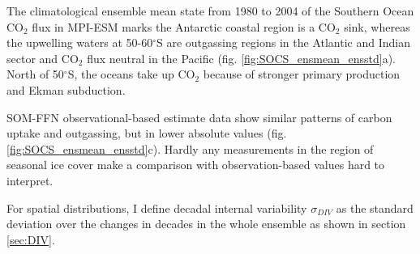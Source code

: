 The climatological ensemble mean state from 1980 to 2004 of the Southern Ocean CO$_2$ flux in \acs{MPI-ESM} marks the Antarctic coastal region is a CO$_2$ sink, whereas the upwelling waters at 50-60$^\circ$S are outgassing regions in the Atlantic and Indian sector and CO$_2$ flux neutral in the Pacific (fig. \ref{fig:SOCS_ensmean_ensstd}a). North of 50$^\circ$S, the oceans take up CO$_2$ because of stronger primary production and Ekman subduction.\newline

 
\acs{SOM-FFN} observational-based estimate data show similar patterns of carbon uptake and outgassing, but in lower absolute values (fig. \ref{fig:SOCS_ensmean_ensstd}c). 
Hardly any measurements in the region of seasonal ice cover make a comparison with observation-based values hard to interpret.\newline

For spatial distributions, I define decadal internal variability $\sigma_{DIV}$ as the standard deviation over the changes in decades in the whole ensemble as shown in section \ref{sec:DIV}.

